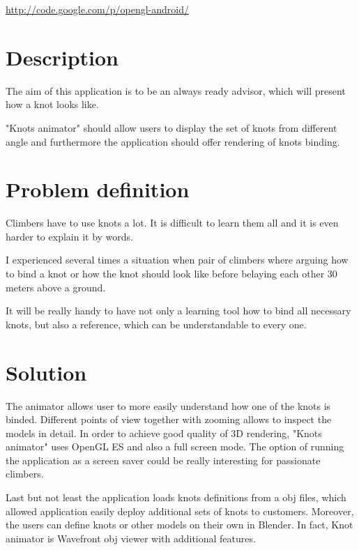 \label{cha:Opengl-Android application}
\url{http://code.google.com/p/opengl-android/}

\section{Description} %
\label{sec:Description}
The aim of this application is to be an always ready advisor, which will
present how a knot looks like. 

"Knots animator" should  allow users to display the set of knots from different angle
and furthermore the application should offer rendering of knots binding.


\section*{Problem definition} %
\label{sec:Problem definition}
Climbers have to use knots a lot. It is difficult to learn them all
and it is even harder to explain it by words.

I experienced several times a situation when pair of climbers
where arguing how to bind a knot or how the knot should look like 
before belaying each other 30 meters above a ground.

It will be really handy to have not only a learning tool
how to bind all necessary knots, but also a reference, 
which can be understandable to every one.


\section*{Solution} %
\label{sec:Solution}

The animator allows user to more easily understand how one of the knots is binded.
Different points of view together with zooming allows to inspect the models in detail. 
In order to achieve good quality of 3D rendering, "Knots animator" 
uses OpenGL ES and also a full screen mode. 
The option of running the application as a screen saver could be really interesting
for passionate climbers.

Last but not least the application loads knots definitions from a obj files,
which allowed application easily deploy additional sets of knots to customers.
Moreover, the users can define knots or other models on their own in Blender.
In fact, Knot animator is Wavefront obj viewer with additional features.

